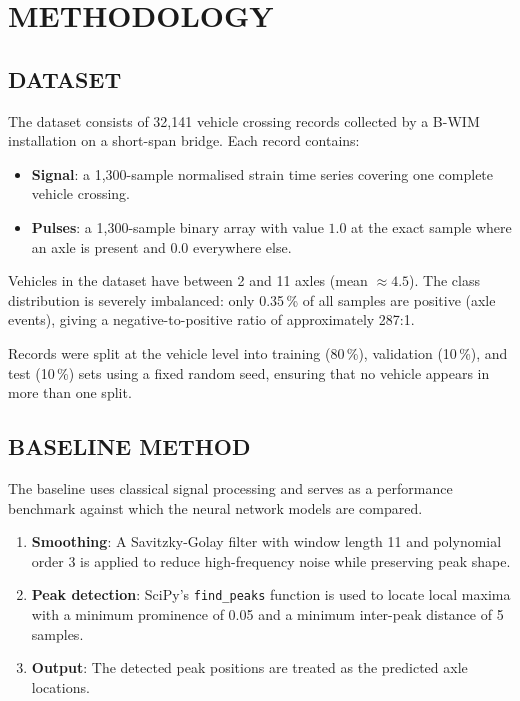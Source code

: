 \chapter{METHODOLOGY}

\section{DATASET}

The dataset consists of 32,141 vehicle crossing records collected by a B-WIM
installation on a short-span bridge. Each record contains:

\begin{itemize}
    \item \textbf{Signal}: a 1,300-sample normalised strain time series covering
          one complete vehicle crossing.
    \item \textbf{Pulses}: a 1,300-sample binary array with value $1.0$ at the
          exact sample where an axle is present and $0.0$ everywhere else.
\end{itemize}

Vehicles in the dataset have between 2 and 11 axles (mean $\approx 4.5$). The
class distribution is severely imbalanced: only 0.35\,\% of all samples are
positive (axle events), giving a negative-to-positive ratio of approximately
287:1.

Records were split at the vehicle level into training (80\,\%), validation
(10\,\%), and test (10\,\%) sets using a fixed random seed, ensuring that no
vehicle appears in more than one split.

\section{BASELINE METHOD}

The baseline uses classical signal processing and serves as a performance
benchmark against which the neural network models are compared.

\begin{enumerate}
    \item \textbf{Smoothing}: A Savitzky-Golay filter \cite{SavitzkyGolay1964}
          with window length 11 and polynomial order 3 is applied to reduce
          high-frequency noise while preserving peak shape.
    \item \textbf{Peak detection}: SciPy's \texttt{find\_peaks} function
          \cite{Scipy2020} is used to locate local maxima with a minimum
          prominence of 0.05 and a minimum inter-peak distance of 5 samples.
    \item \textbf{Output}: The detected peak positions are treated as the
          predicted axle locations.
\end{enumerate}

